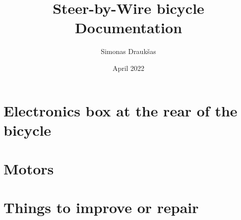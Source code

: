 \documentclass[12pt,a4paper]{report}
\title{Steer-by-Wire bicycle \\ Documentation}
\author{Simonas Draukšas}
\date{April 2022}
\begin{document}
\maketitle

\tableofcontents

\chapter{Electronics box at the rear of the bicycle}


\chapter{Motors}


\chapter{Things to improve or repair}

\end{document}
